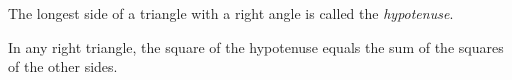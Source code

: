 \documentclass{article}
\begin{document}
\begin{Definition}
  The longest side of a triangle with a right angle
  is called the \emph{hypotenuse}.
\end{Definition}
\begin{Theorem}[Pythagoras]
  \label{pythagoras}
  In any right triangle, the square of the hypotenuse
  equals the sum of the squares of the other sides.
\end{Theorem}
\end{document}
